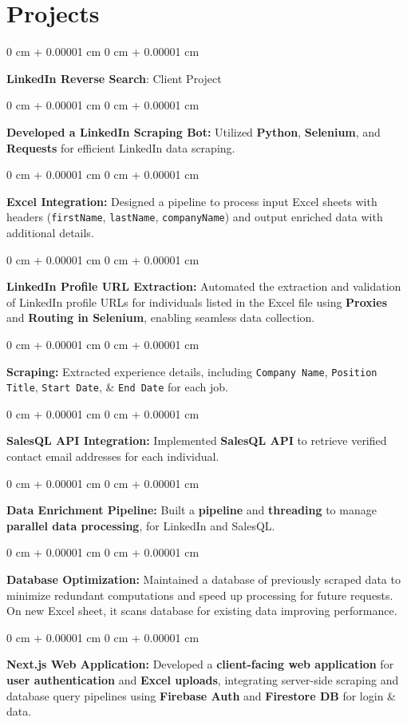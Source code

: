 \documentclass[10pt, letterpaper]{article}
\newenvironment{onecolentry}{
    \begin{adjustwidth}{
        0 cm + 0.00001 cm
    }{
        0 cm + 0.00001 cm
    }
}{
    \end{adjustwidth}
} %
\begin{document}
\section{Projects}
\vspace{0.05 cm}
\begin{onecolentry}
  \textbf{\large LinkedIn Reverse Search}: Client Project
  \begin{onecolentry}
    \textbf{Developed a LinkedIn Scraping Bot:} Utilized \textbf{Python}, \textbf{Selenium}, and \textbf{Requests} for efficient LinkedIn data scraping.
  \end{onecolentry}
  \begin{onecolentry}
    \textbf{Excel Integration:} Designed a pipeline to process input Excel sheets with headers (\texttt{firstName}, \texttt{lastName}, \texttt{companyName}) and output enriched data with additional details.
  \end{onecolentry}
  \begin{onecolentry}
    \textbf{LinkedIn Profile URL Extraction:} Automated the extraction and validation of LinkedIn profile URLs for individuals listed in the Excel file using \textbf{Proxies} and \textbf{Routing in Selenium}, enabling seamless data collection.
  \end{onecolentry}
  \begin{onecolentry}
    \textbf{Scraping:} Extracted experience details, including \texttt{Company Name}, \texttt{Position Title}, \texttt{Start Date}, \& \texttt{End Date} for each job.
  \end{onecolentry}
  \begin{onecolentry}
    \textbf{SalesQL API Integration:} Implemented \textbf{SalesQL API} to retrieve verified contact email addresses for each individual.
  \end{onecolentry}
  \begin{onecolentry}
    \textbf{Data Enrichment Pipeline:} Built a \textbf{pipeline} and \textbf{threading} to manage \textbf{parallel data processing}, for LinkedIn and SalesQL.
  \end{onecolentry}
  \begin{onecolentry}
    \textbf{Database Optimization:} Maintained a database of previously scraped data to minimize redundant computations and speed up processing for future requests. On new Excel sheet, it scans database for existing data improving performance.
  \end{onecolentry}
  \begin{onecolentry}
    \textbf{Next.js Web Application:} Developed a \textbf{client-facing web application} for \textbf{user authentication} and \textbf{Excel uploads}, integrating server-side scraping and database query pipelines using \textbf{Firebase Auth} and \textbf{Firestore DB} for login \& data.

\end{onecolentry}
\end{onecolentry}
\end{document}
